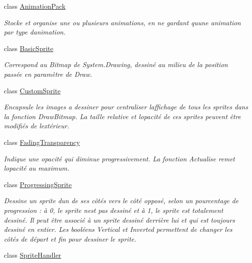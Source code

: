 \begin{DoxyCompactItemize}
class \hyperlink{class_tentacle_slicers_1_1graphics_1_1_animation_pack}{Animation\+Pack}
\begin{DoxyCompactList}\small\item\em Stocke et organise une ou plusieurs animations, en ne gardant qu\textquotesingle{}une animation par type d\textquotesingle{}animation. \end{DoxyCompactList}\item 
class \hyperlink{class_tentacle_slicers_1_1graphics_1_1_basic_sprite}{Basic\+Sprite}
\begin{DoxyCompactList}\small\item\em Correspond au Bitmap de System.\+Drawing, dessiné au milieu de la position passée en paramètre de Draw. \end{DoxyCompactList}\item 
class \hyperlink{class_tentacle_slicers_1_1graphics_1_1_custom_sprite}{Custom\+Sprite}
\begin{DoxyCompactList}\small\item\em Encapsule les images a dessiner pour centraliser l\textquotesingle{}affichage de tous les sprites dans la fonction Draw\+Bitmap. La taille relative et l\textquotesingle{}opacité de ces sprites peuvent être modifiés de l\textquotesingle{}extérieur. \end{DoxyCompactList}\item 
class \hyperlink{class_tentacle_slicers_1_1graphics_1_1_fading_transparency}{Fading\+Transparency}
\begin{DoxyCompactList}\small\item\em Indique une opacité qui diminue progressivement. La fonction Actualise remet l\textquotesingle{}opacité au maximum. \end{DoxyCompactList}\item 
class \hyperlink{class_tentacle_slicers_1_1graphics_1_1_progressing_sprite}{Progressing\+Sprite}
\begin{DoxyCompactList}\small\item\em Dessine un sprite d\textquotesingle{}un de ses côtés vers le côté opposé, selon un pourcentage de progression \+: à 0, le sprite n\textquotesingle{}est pas dessiné et à 1, le sprite est totalement dessiné. Il peut être associé à un sprite dessiné derrière lui et qui est toujours dessiné en entier. Les booléens Vertical et Inverted permettent de changer les côtés de départ et fin pour dessiner le sprite. \end{DoxyCompactList}\item 
class \hyperlink{class_tentacle_slicers_1_1graphics_1_1_sprite_handler}{Sprite\+Handler}

\end{DoxyCompactItemize}
